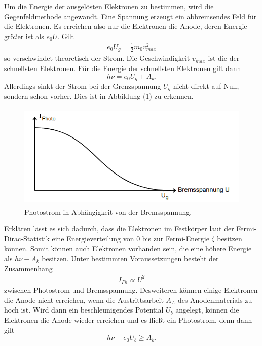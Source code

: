 Um die Energie der ausgelösten Elektronen zu bestimmen, wird die Gegenfeldmethode angewandt.
Eine Spannung erzeugt ein abbremsendes Feld für die Elektronen. Es erreichen also nur die Elektronen die Anode, deren Energie größer ist als $e_0 U$.
Gilt
\begin{align}
  e_0 U_g = \frac{1}{2} m_0 v_{max}^2
\end{align}
so verschwindet theoretisch der Strom. Die Geschwindigkeit $v_{max}$ ist die der schnellsten Elektronen.
Für die Energie der schnellsten Elektronen gilt dann
\begin{equation}
  h \nu = e_0 U_g  + A_k .
\end{equation}
Allerdings sinkt der Strom bei der Grenzspannung $U_g$ nicht direkt auf Null, sondern schon vorher. Dies ist in Abbildung (1) zu erkennen. 
\begin{figure}[H]
  \centering
  \includegraphics[height=5cm]{strom.PNG}
  \caption{Photostrom in Abhängigkeit von der Bremsspannung. \cite{kent}}
  \label{fig:kathode}
\end{figure}
Erklären lässt es sich dadurch, dass die Elektronen im Festkörper laut der Fermi-Dirac-Statistik eine Energieverteilung von $0$ bis zur Fermi-Energie $\zeta$ besitzen können. Somit können auch Elektronen vorhanden sein, die eine höhere Energie als $h \nu - A_k$ besitzen. 
Unter bestimmten Voraussetzungen besteht der Zusammenhang
\begin{align*}
  I_{Ph} \propto U^2
\end{align*}
zwischen Photostrom und Bremsspannung.
Desweiteren können einige Elektronen die Anode nicht erreichen, wenn die Austrittsarbeit $A_A$ des Anodenmaterials zu hoch ist. Wird dann ein beschleunigendes Potential $U_b$ angelegt, können die Elektronen die Anode wieder erreichen und es fließt ein Photostrom, denn dann gilt
\begin{equation}
  h \nu + e_0 U_b  \geq  A_k .
\end{equation}





